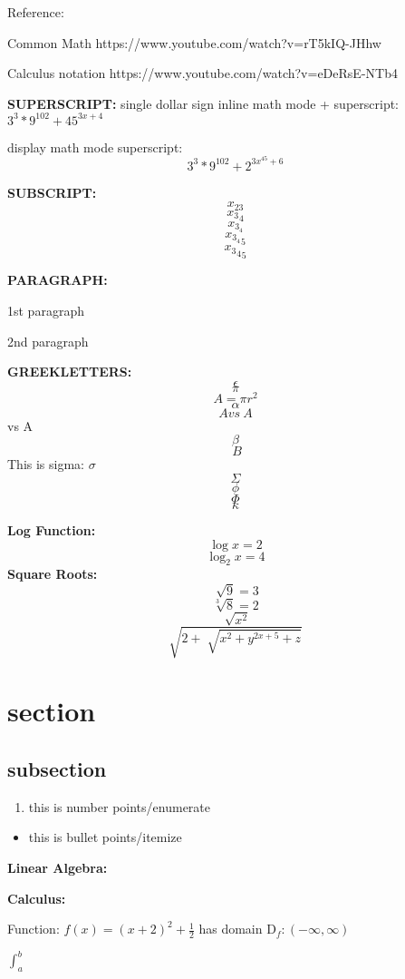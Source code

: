 \documentclass[12pt]{article}
\begin{document}
Reference: \par
Common Math
https://www.youtube.com/watch?v=rT5kIQ-JHhw

Calculus notation
https://www.youtube.com/watch?v=eDeRsE-NTb4


\textbf{SUPERSCRIPT:}
single dollar sign inline math mode + superscript: $3^3 * 9^{102} + 45^{3x+4}$


display math mode superscript: $$3^3 * 9^{102} + 2^{3x^{45}+6}$$


\textbf{SUBSCRIPT:}
$$x_{23}$$
$${x_3}_4$$
$$x_{3_4}$$
$${x_{3_4}}_5$$
$${{{x_3}_4}_5}$$

\textbf{PARAGRAPH:}

1st paragraph \par 2nd paragraph

\textbf{GREEKLETTERS:}
$$\epsilon$$
$$\pi$$ $$A=\pi r^2$$
$$\alpha$$
$$A vs \ A$$  vs A 
$$\beta$$
$$ \ B$$
This is sigma: $\sigma$\\
$$\Sigma$$
$$\phi$$
$$\Phi$$
$$\kappa$$

\textbf{Log Function:}
$$\log x =2$$
$$\log_2 x =4$$
\textbf{Square Roots:}
$$\sqrt[]{9}=3$$
$$\sqrt[3]{8} =2$$
$$\sqrt[]{x^2}$$
$$\sqrt{2+\sqrt[]{x^2+y^{2x+5}+z}}$$



\section{section}

\subsection{subsection}

\begin{enumerate}
\item this is number points/enumerate
\end{enumerate}

\begin{itemize}
\item this is bullet points/itemize
\end{itemize}



\textbf{Linear Algebra:}

\textbf{Calculus:}

Function: $f(x) = (x+2)^2 + \frac{1}{2} $ has domain $ \mathrm{D}_f : (-\infty, \infty)$

$ \int_a^b $\\
\end{document}
